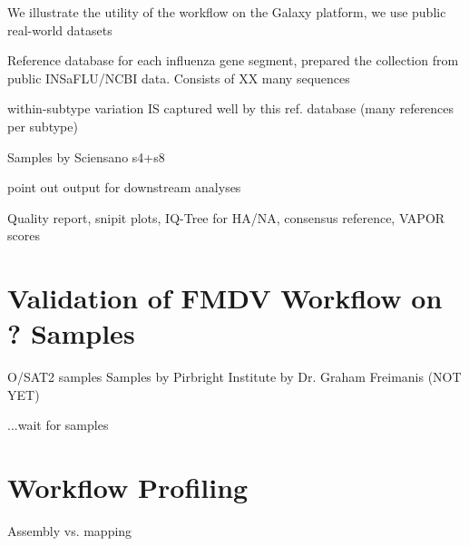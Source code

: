 We illustrate the utility of the workflow on the Galaxy platform, we use public real-world datasets

Reference database for each influenza gene segment, prepared the collection from public INSaFLU/NCBI data. Consists of XX many sequences

within-subtype variation IS captured well by this ref. database (many references per subtype)


Samples by Sciensano s4+s8

point out output for downstream analyses 

Quality report, snipit plots, IQ-Tree for \ac{HA}/\ac{NA}, consensus reference, VAPOR scores

\section{Validation of FMDV Workflow on ? Samples}
O/SAT2 samples
\todoit
Samples by Pirbright Institute by Dr. Graham Freimanis (NOT YET)

...wait for samples

\section{Workflow Profiling}
\todoit
Assembly vs. mapping
 